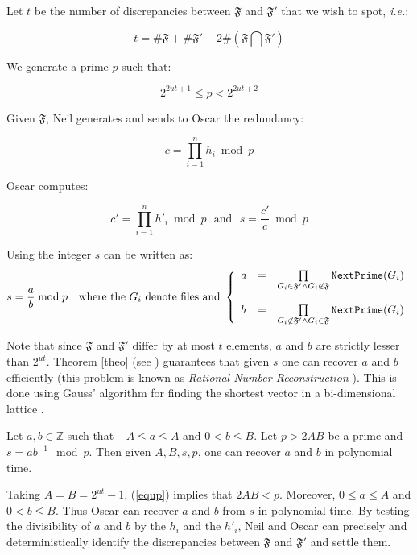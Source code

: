 \documentclass[11pt]{llncs}
\begin{document}
Let $t$ be the number of discrepancies between $\mathfrak{F}$ and $\mathfrak{F}'$ that we wish to spot, {\sl i.e.}:

$$t=\#\mathfrak{F}+\#\mathfrak{F}'-2 \#(\mathfrak{F} \bigcap \mathfrak{F}')$$

We generate a prime $p$ such that:

\begin{equation}
\label{equp}
2^{2ut+1} \leq p < 2^{2ut+2}
\end{equation}

Given $\mathfrak{F}$, Neil generates and sends to Oscar the redundancy:

$$
c=\prod_{i=1}^n h_i \bmod p
$$

Oscar computes:\smallskip

$$c'=\prod_{i=1}^n h'_i \bmod p{~~~\mbox{and}~~~}s=\frac{c'}{c} \bmod p$$

Using \cite{vallee} the integer $s$ can be written as:
$$s=\frac{a}{b} \bmod p{~~~\mbox{where the~}G_i\mbox{~denote files and~}}
\left\{
\begin{array}{lcr}
a & =&  \prod\limits_{G_i \in \mathfrak{F}'\wedge G_i \not\in\mathfrak{F}} \mbox{{\tt NextPrime}}(G_i) \\
\\
b & = & \prod\limits_{G_i \not\in\mathfrak{F}' \wedge G_i \in\mathfrak{F}} \mbox{{\tt NextPrime}}(G_i)
\end{array}
\right.
$$

Note that since $\mathfrak{F}$ and $\mathfrak{F}'$ differ by at most $t$ elements, $a$ and $b$ are strictly lesser than $2^{ut}$. Theorem \ref{theo} (see \cite{cryptorational}) guarantees that given $s$ one can recover $a$ and $b$ efficiently (this problem is known as {\sl Rational Number Reconstruction} \cite{pan2004rational,wang2003acceleration}). This is done using Gauss' algorithm for finding the shortest vector in a bi-dimensional lattice \cite{vallee}.

\begin{theorem}
\label{theo}
Let $a,b \in {\mathbb Z}$ such that $-A \leq a \leq A$ and $0<b \leq B$. Let $p>2AB$ be a prime and $s=a b^{-1} \mod p$.
Then given $A,B,s,p$, one can recover $a$ and $b$ in polynomial time.
\end{theorem}

Taking $A=B=2^{ut}-1$, (\ref{equp}) implies that $2AB<p$. Moreover, $0 \leq a \leq A$ and $0 <b \leq B$. Thus Oscar can
recover $a$ and $b$ from $s$ in polynomial time. By testing the divisibility of $a$ and $b$ by the $h_i$ and the $h'_i$, Neil and Oscar can
precisely and deterministically identify the discrepancies between $\mathfrak{F}$ and $\mathfrak{F}'$ and settle them.\smallskip
\end{document}
